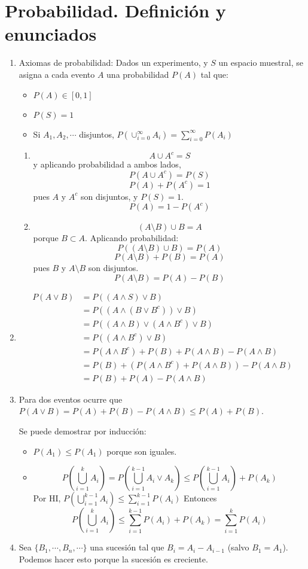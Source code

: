 \section{Probabilidad. Definición y enunciados}
\begin{enumerate}
	\item Axiomas de probabilidad: Dados un experimento, y $S$ un espacio muestral, se asigna a cada evento $A$ una probabilidad $P(A)$ tal que:
	\begin{itemize}
		\item $P(A) \in [0,1]$
		\item $P(S) = 1$
		\item Si $A_1, A_2, \cdots$ disjuntos, $P(\cup_{i=0}^{\infty} A_i) = \sum_{i=0}^{\infty}P(A_i)$
	\end{itemize}
	\begin{enumerate}
		\item
			$$A \cup A^c = S$$ y aplicando probabilidad a ambos lados,
			$$P(A \cup A^c) = P(S)$$ 
			$$P(A) + P(A^c) = 1$$ pues $A$ y $A^c$ son disjuntos, y $P(S)=1$. 
			$$P(A) = 1 - P(A^c)$$ 
		\item 
			$$(A\setminus B) \cup B = A$$ porque $B\subset A$. Aplicando probabilidad:
			$$P((A\setminus B) \cup B) = P(A)$$
			$$P(A\setminus B) + P(B) = P(A)$$ pues $B$ y $A\setminus B$ son disjuntos.
			$$P(A\setminus B)= P(A) - P(B)$$
	\end{enumerate}
	\item
		\begin{align*}
			P(A\lor B)	& = P((A\land S)\lor B)									\\
						& = P((A\land (B\lor B^c))\lor B)						\\
						& = P((A\land B) \lor (A\land B^c) \lor B)				\\
						& = P((A\land B^c) \lor B)								\\
						& = P(A\land B^c) + P(B) + P(A\land B) - P(A\land B)	\\
						& = P(B) + (P(A\land B^c) + P(A\land B)) - P(A\land B)	\\
						& = P(B) + P(A) - P(A\land B)
		\end{align*}
	\item
		Para dos eventos ocurre que $P(A\lor B) = P(A) + P(B) - P(A\land B) \leq P(A) + P(B)$.
		
		Se puede demostrar por inducción:
			\begin{itemize}
				\item $P(A_1) \leq P(A_1)$ porque son iguales.
				\item $$P\left(\bigcup_{i=1}^kA_i\right) = P\left(\bigcup_{i=1}^{k-1}A_i \lor A_k\right) \leq P\left(\bigcup_{i=1}^{k-1}A_i\right) + P(A_k)$$
					Por HI, $P\left(\bigcup_{i=1}^{k-1}A_i\right) \leq \sum_{i=1}^{k-1}P(A_i)$
					Entonces $$P\left(\bigcup_{i=1}^kA_i\right) \leq \sum_{i=1}^{k-1}P(A_i) + P(A_k) = \sum_{i=1}^kP(A_i)$$
			\end{itemize}
	\item
		Sea $\{B_1, \cdots, B_n, \cdots\}$ una sucesión tal que $B_i = A_i - A_{i-1}$ (salvo $B_1 = A_1$). Podemos hacer esto porque la sucesión es creciente.
		

\end{enumerate}
